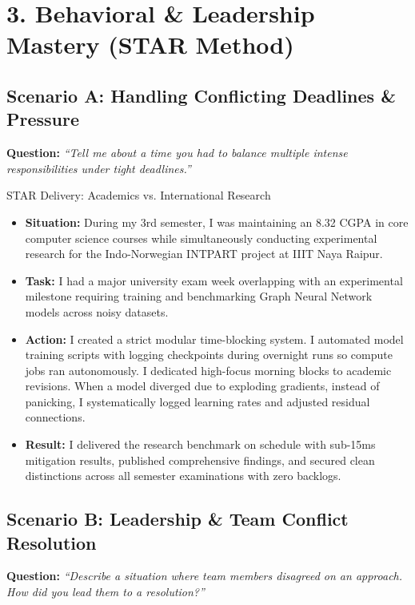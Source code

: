 \documentclass[10pt,a4paper]{article}
\begin{document}
\section{3. Behavioral \& Leadership Mastery (STAR Method)}

\subsection{Scenario A: Handling Conflicting Deadlines \& Pressure}
\textbf{Question:} \textit{``Tell me about a time you had to balance multiple intense responsibilities under tight deadlines.''}

\begin{calloutbox}{STAR Delivery: Academics vs. International Research}
\begin{itemize}[noitemsep]
    \item \textbf{Situation:} During my 3rd semester, I was maintaining an 8.32 CGPA in core computer science courses while simultaneously conducting experimental research for the Indo-Norwegian INTPART project at IIIT Naya Raipur.
    \item \textbf{Task:} I had a major university exam week overlapping with an experimental milestone requiring training and benchmarking Graph Neural Network models across noisy datasets.
    \item \textbf{Action:} I created a strict modular time-blocking system. I automated model training scripts with logging checkpoints during overnight runs so compute jobs ran autonomously. I dedicated high-focus morning blocks to academic revisions. When a model diverged due to exploding gradients, instead of panicking, I systematically logged learning rates and adjusted residual connections.
    \item \textbf{Result:} I delivered the research benchmark on schedule with sub-15ms mitigation results, published comprehensive findings, and secured clean distinctions across all semester examinations with zero backlogs.
\end{itemize}
\end{calloutbox}

\subsection{Scenario B: Leadership \& Team Conflict Resolution}
\textbf{Question:} \textit{``Describe a situation where team members disagreed on an approach. How did you lead them to a resolution?''}
\end{document}
